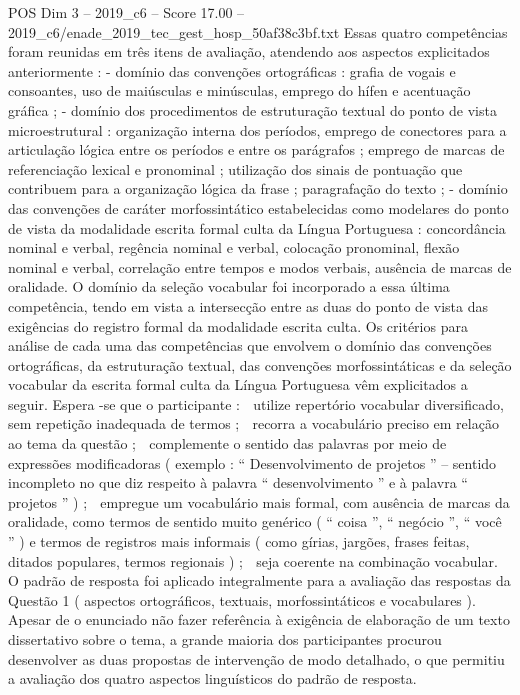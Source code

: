 \begin{textsample}{POS Dim 3 – 2019\_c6 – Score 17.00 – 2019\_c6/enade\_2019\_tec\_gest\_hosp\_50af38c3bf.txt}
Essas quatro competências foram reunidas em três itens de avaliação, atendendo aos aspectos explicitados anteriormente : - domínio das convenções ortográficas : grafia de vogais e consoantes, uso de maiúsculas e minúsculas, emprego do hífen e acentuação gráfica ; - domínio dos procedimentos de estruturação textual do ponto de vista microestrutural : organização interna dos períodos, emprego de conectores para a articulação lógica entre os períodos e entre os parágrafos ; emprego de marcas de referenciação lexical e pronominal ; utilização dos sinais de pontuação que contribuem para a organização lógica da frase ; paragrafação do texto ; - domínio das convenções de caráter morfossintático estabelecidas como modelares do ponto de vista da modalidade escrita formal culta da Língua Portuguesa : concordância nominal e verbal, regência nominal e verbal, colocação pronominal, flexão nominal e verbal, correlação entre tempos e modos verbais, ausência de marcas de oralidade.
O domínio da seleção vocabular foi incorporado a essa última competência, tendo em vista a intersecção entre as duas do ponto de vista das exigências do registro formal da modalidade escrita culta.
Os critérios para análise de cada uma das competências que envolvem o domínio das convenções ortográficas, da estruturação textual, das convenções morfossintáticas e da seleção vocabular da escrita formal culta da Língua Portuguesa vêm explicitados a seguir.
Espera -se que o participante :  utilize repertório vocabular diversificado, sem repetição inadequada de termos ;  recorra a vocabulário preciso em relação ao tema da questão ;  complemente o sentido das palavras por meio de expressões modificadoras ( exemplo : “ Desenvolvimento de projetos ” – sentido incompleto no que diz respeito à palavra “ desenvolvimento ” e à palavra “ projetos ” ) ;  empregue um vocabulário mais formal, com ausência de marcas da oralidade, como termos de sentido muito genérico ( “ coisa ”, “ negócio ”, “ você ” ) e termos de registros mais informais ( como gírias, jargões, frases feitas, ditados populares, termos regionais ) ;  seja coerente na combinação vocabular.
O padrão de resposta foi aplicado integralmente para a avaliação das respostas da Questão 1 ( aspectos ortográficos, textuais, morfossintáticos e vocabulares ).
Apesar de o enunciado não fazer referência à exigência de elaboração de um texto dissertativo sobre o tema, a grande maioria dos participantes procurou desenvolver as duas propostas de intervenção de modo detalhado, o que permitiu a avaliação dos quatro aspectos linguísticos do padrão de resposta.

\end{textsample}
